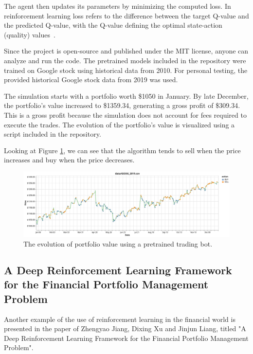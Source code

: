 \documentclass[a4paper,oneside,onecolumn,12pt]{book}
\begin{document}
	The agent then updates its parameters by minimizing the computed loss. In reinforcement learning loss refers to the difference between the target Q-value and the predicted Q-value, with the Q-value defining the optimal state-action (quality) values~\cite{HMLSKT}.

	Since the project is open-source and published under the MIT license, anyone can analyze and run the code. The pretrained models included in the repository were trained on Google stock using historical data from 2010. For personal testing, the provided historical Google stock data from 2019 was used.

	The simulation starts with a portfolio worth \$1050 in January. By late December, the portfolio's value increased to \$1359.34, generating a gross profit of \$309.34. This is a gross profit because the simulation does not account for fees required to execute the trades. The evolution of the portfolio's value is visualized using a script included in the repository.

	Looking at Figure \ref{fig:STBRL portfolio evolution}, we can see that the algorithm tends to sell when the price increases and buy when the price decreases.
	\begin{figure}[H]
	\begin{center}
		\includegraphics[width=\linewidth]{kep/trade_bot_visualization.png}
		\caption{The evolution of portfolio value using a pretrained trading bot.}
		\label{fig:STBRL portfolio evolution}
	\end{center}
	\end{figure}

	\subsection{A Deep Reinforcement Learning Framework for the Financial Portfolio Management Problem~\cite{ADRLFFPMP}}\label{paper_ADRLFFPMP}
	Another example of the use of reinforcement learning in the financial world is presented in the paper of Zhengyao Jiang, Dixing Xu and Jinjun Liang, titled "A Deep Reinforcement Learning Framework for the Financial Portfolio Management Problem". 
	
\end{document}
